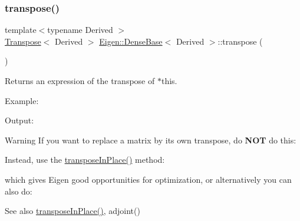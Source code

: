 \subsubsection{\texorpdfstring{transpose()}{transpose()}\hspace{0.1cm}{\footnotesize\ttfamily [1/2]}}
{\footnotesize\ttfamily template$<$typename Derived $>$ \\
\mbox{\hyperlink{class_eigen_1_1_transpose}{Transpose}}$<$ Derived $>$ \mbox{\hyperlink{class_eigen_1_1_dense_base}{Eigen\+::\+Dense\+Base}}$<$ Derived $>$\+::transpose (\begin{DoxyParamCaption}{ }\end{DoxyParamCaption})\hspace{0.3cm}{\ttfamily [inline]}}

\begin{DoxyReturn}{Returns}
an expression of the transpose of $\ast$this.
\end{DoxyReturn}
Example\+: 
\begin{DoxyCodeInclude}{0}
\end{DoxyCodeInclude}
 Output\+: 
\begin{DoxyVerbInclude}
\end{DoxyVerbInclude}


\begin{DoxyWarning}{Warning}
If you want to replace a matrix by its own transpose, do {\bfseries{N\+OT}} do this\+: 
\begin{DoxyCode}{0}
\end{DoxyCode}
 Instead, use the \mbox{\hyperlink{class_eigen_1_1_dense_base_ac501bd942994af7a95d95bee7a16ad2a}{transpose\+In\+Place()}} method\+: 
\begin{DoxyCode}{0}
\end{DoxyCode}
 which gives Eigen good opportunities for optimization, or alternatively you can also do\+: 
\begin{DoxyCode}{0}
\end{DoxyCode}

\end{DoxyWarning}
\begin{DoxySeeAlso}{See also}
\mbox{\hyperlink{class_eigen_1_1_dense_base_ac501bd942994af7a95d95bee7a16ad2a}{transpose\+In\+Place()}}, adjoint() 
\end{DoxySeeAlso}
\mbox{\label{class_eigen_1_1_dense_base_a38c0b074cf93fc194bf91141287cee3f}} 
